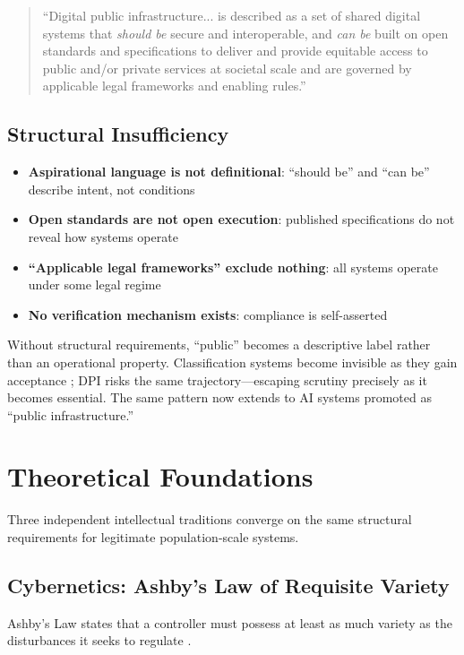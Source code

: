 \documentclass[11pt,a4paper]{article}
\begin{document}
\begin{quote}
``Digital public infrastructure... is described as a set of shared digital systems that \textit{should be} secure and interoperable, and \textit{can be} built on open standards and specifications to deliver and provide equitable access to public and/or private services at societal scale and are governed by applicable legal frameworks and enabling rules.'' \citep{g20}
\end{quote}

\subsection{Structural Insufficiency}

\begin{itemize}
    \item \textbf{Aspirational language is not definitional}: ``should be'' and ``can be'' describe intent, not conditions
    \item \textbf{Open standards are not open execution}: published specifications do not reveal how systems operate
    \item \textbf{``Applicable legal frameworks'' exclude nothing}: all systems operate under some legal regime
    \item \textbf{No verification mechanism exists}: compliance is self-asserted
\end{itemize}

Without structural requirements, ``public'' becomes a descriptive label rather than an operational property. Classification systems become invisible as they gain acceptance \citep{bowker1999}; DPI risks the same trajectory---escaping scrutiny precisely as it becomes essential. The same pattern now extends to AI systems promoted as ``public infrastructure.''

\section{Theoretical Foundations}

Three independent intellectual traditions converge on the same structural requirements for legitimate population-scale systems.

\subsection{Cybernetics: Ashby's Law of Requisite Variety}

Ashby's Law states that a controller must possess at least as much variety as the disturbances it seeks to regulate \citep{ashby1956}.
\end{document}
